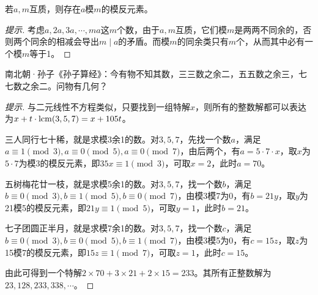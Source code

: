 \begin{theorem}[模反的存在性]
  若$a,m$互质，则存在$a$模$m$的模反元素。
\end{theorem}
\begin{proof}[提示]
  考虑$a,2a,3a,\cdots,ma$这$m$个数，由于$a,m$互质，它们模$m$是两两不同余的，否则两个同余的相减会导出$m\mid a$的矛盾。而模$m$的同余类只有$m$个，从而其中必有一个模$m$等于1。
\end{proof}

\begin{example}
  南北朝·孙子《孙子算经》：今有物不知其数，三三数之余二，五五数之余三，七七数之余二。问物有几何？
\end{example}
\begin{proof}[提示]
  与二元线性不方程类似，只要找到一组特解$x$，则所有的整数解都可以表达为$x+t\cdot\mathrm{lcm}(3,5,7)=x+105t$。

  三人同行七十稀，就是求模3余1的数。对$3,5,7$，先找一个数$a$，满足$a\equiv 1\pmod3, a\equiv0\pmod5, a\equiv0\pmod7$，由后两个，有$a=5\cdot7\cdot x$，取$x$为$5\cdot 7$为模$3$的模反元素，即$35x\equiv1\pmod3$，可取$x=2$，此时$a=70$。

  五树梅花廿一枝，就是求模5余1的数。对$3,5,7$，找一个数$b$，满足$b\equiv0\pmod3, b\equiv1\pmod5,b\equiv0\pmod7$，由模3模7为0，有$b=21y$，取$y$为21模5的模反元素，即$21y\equiv1\pmod5$，可取$y=1$，此时$b=21$。

  七子团圆正半月，就是求模7余1的数。对$3,5,7$，找一个数$c$，满足$b\equiv0\pmod3, b\equiv0\pmod5,b\equiv1\pmod7$，由模3模5为0，有$c=15z$，取$z$为15模7的模反元素，即$15z\equiv1\pmod7$，可取$z=1$，此时$c=15$。

  由此可得到一个特解$2\times 70+3\times 21+2\times 15=233$。其所有正整数解为$23,128,233,338,\cdots$。
\end{proof}

